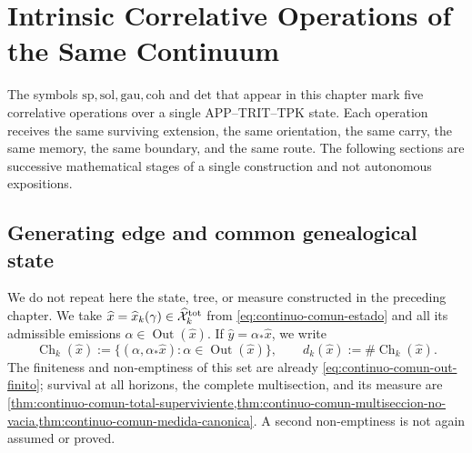 \chapter{Intrinsic Correlative Operations of the Same Continuum}
\label{chap:pdfv2-operaciones-intrinsecas-correlativas}

\begin{thesisbox}
The symbols \(\mathrm{sp},\mathrm{sol},\mathrm{gau},\mathrm{coh}\) and
\(\mathrm{det}\) that appear in this chapter mark five correlative operations
over a single APP--TRIT--TPK state\@. Each operation receives
the same surviving extension, the
same orientation, the same carry, the same memory, the same boundary, and the
same route. The following sections are successive mathematical stages of a
single construction and not autonomous expositions.
\end{thesisbox}

\section{Generating edge and common genealogical state}

We do not repeat here the state, tree, or measure constructed in the preceding
chapter. We take
\(\widehat x=\widehat x_k(\gamma)\in
\widehat{\mathcal X}^{\rm tot}_k\) from
\eqref{eq:continuo-comun-estado} and all its admissible emissions
\(\alpha\in\operatorname{Out}(\widehat x)\). If
\(\widehat y=\alpha_*\widehat x\), we write
\begin{equation}
\label{eq:pdfv2-cor-hijos-supervivientes}
 \operatorname{Ch}_k(\widehat x):=
 \{(\alpha,\alpha_*\widehat x):
      \alpha\in\operatorname{Out}(\widehat x)\},
 \qquad
 d_k(\widehat x):=\#\operatorname{Ch}_k(\widehat x).
\end{equation}
The finiteness and non-emptiness of this set are already
\eqref{eq:continuo-comun-out-finito}; survival at all horizons,
the complete multisection, and its measure are
\cref{thm:continuo-comun-total-superviviente,thm:continuo-comun-multiseccion-no-vacia,thm:continuo-comun-medida-canonica}. A second non-emptiness is not again assumed or proved.

